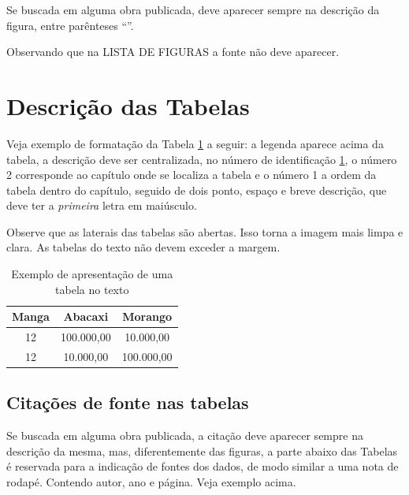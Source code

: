 Se  buscada em alguma obra publicada, deve aparecer sempre na descrição da figura, entre parênteses ``\cite{meregali2004}''.

Observando que na LISTA DE FIGURAS a fonte não deve aparecer.

\section{Descrição das Tabelas}

Veja exemplo de formatação da Tabela \ref{tab:exemplo-texto} a seguir: a legenda aparece acima da tabela, a descrição deve ser centralizada, no número de identificação \ref{tab:exemplo-texto}, o número 2 corresponde ao capítulo onde se localiza a tabela e o número 1 a ordem da tabela dentro do capítulo, seguido de dois ponto, espaço e  breve descrição, que deve ter a \emph{primeira} letra em maiúsculo.

Observe que as laterais das tabelas são abertas. Isso torna a imagem mais limpa e clara. As tabelas do texto não devem exceder a margem.

\begin{table}[h]
    \caption{Exemplo de apresentação de uma tabela no texto}
    \begin{center}
        \begin{tabular}{ c | c | c }
            \hline
            Manga & Abacaxi & Morango \\
            \hline
            12 & 100.000,00 & 10.000,00 \\
            \hline
            12 & 10.000,00 & 100.000,00 \\
            \hline
        \end{tabular}
    \end{center}
    \label{tab:exemplo-texto}
\end{table}

\subsection{Citações de fonte nas tabelas}

Se buscada em alguma obra publicada, a citação deve aparecer sempre na descrição da mesma, mas, diferentemente das figuras, a parte abaixo das Tabelas é reservada para a indicação de fontes dos dados, de modo similar a uma nota de rodapé. Contendo autor, ano e página. Veja exemplo acima.

